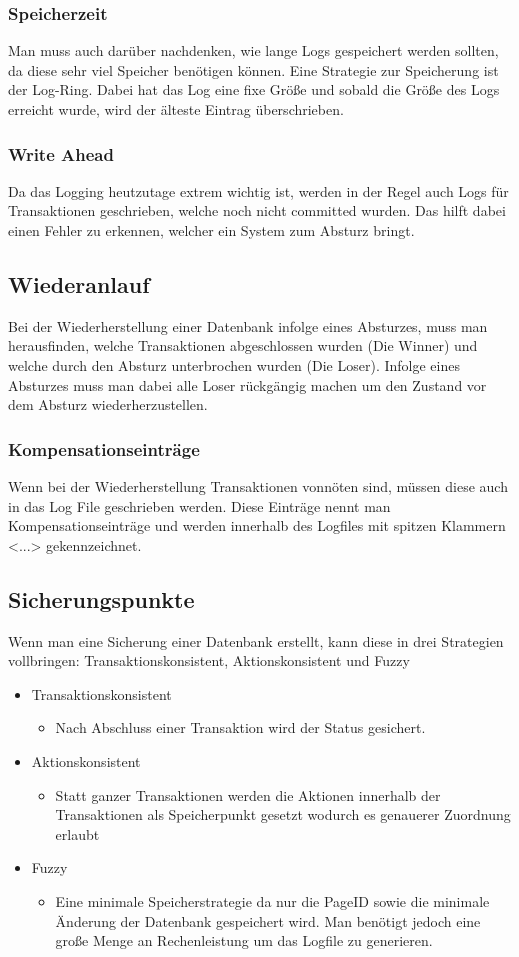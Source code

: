 \documentclass{article}
\begin{document}
	\subsubsection{Speicherzeit}
	Man muss auch darüber nachdenken, wie lange Logs gespeichert werden sollten, da diese sehr viel Speicher benötigen können. Eine Strategie zur Speicherung ist der Log-Ring. Dabei hat das Log eine fixe Größe und sobald die Größe des Logs erreicht wurde, wird der älteste Eintrag überschrieben.
	\subsubsection{Write Ahead}
	Da das Logging heutzutage extrem wichtig ist, werden in der Regel auch Logs für Transaktionen geschrieben, welche noch nicht committed wurden. Das hilft dabei einen Fehler zu erkennen, welcher ein System zum Absturz bringt.
	\subsection{Wiederanlauf}
	Bei der Wiederherstellung einer Datenbank infolge eines Absturzes, muss man herausfinden, welche Transaktionen abgeschlossen wurden (Die Winner) und welche durch den Absturz unterbrochen wurden (Die Loser). Infolge eines Absturzes muss man dabei alle Loser rückgängig machen um den Zustand vor dem Absturz wiederherzustellen.
	\subsubsection{Kompensationseinträge}
	Wenn bei der Wiederherstellung Transaktionen vonnöten sind, müssen diese auch in das Log File geschrieben werden. Diese Einträge nennt man Kompensationseinträge und werden innerhalb des Logfiles mit spitzen Klammern <...> gekennzeichnet.
	\subsection{Sicherungspunkte}
	Wenn man eine Sicherung einer Datenbank erstellt, kann diese in drei Strategien vollbringen: Transaktionskonsistent, Aktionskonsistent und Fuzzy
	\begin{itemize}
		\item{Transaktionskonsistent}
		\begin{itemize}
			\item{Nach Abschluss einer Transaktion wird der Status gesichert.}
		\end{itemize}
		\item{Aktionskonsistent}
		\begin{itemize}
			\item{Statt ganzer Transaktionen werden die Aktionen innerhalb der Transaktionen als Speicherpunkt gesetzt wodurch es genauerer Zuordnung erlaubt}
		\end{itemize}
		\item{Fuzzy}
		\begin{itemize}
			\item{Eine minimale Speicherstrategie da nur die PageID sowie die minimale Änderung der Datenbank gespeichert wird. Man benötigt jedoch eine große Menge an Rechenleistung um das Logfile zu generieren.}
		\end{itemize}
	\end{itemize}	
\end{document}
